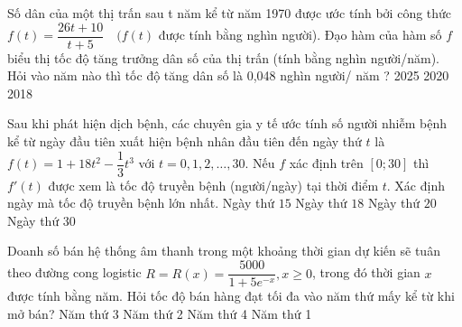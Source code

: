 \begin{ex}
	Số dân của một thị trấn sau t năm kể từ năm 1970 được ước tính bởi công thức $f(t)=\dfrac{26 t+10}{t+5}\quad (f(t)$ được tính bằng nghìn người). Đạo hàm của hàm số $f$ biểu thị tốc độ tăng trưởng dân số của thị trấn (tính bằng nghìn người/năm). Hỏi vào năm nào thì tốc độ tăng dân số là 0,048 nghìn người/ năm ?
	\choice
	{ 2025}
	{2020}
	{}
	{2018}
	\loigiai{
		
	}
\end{ex}
\begin{ex}%
	Sau khi phát hiện dịch bệnh, các chuyên gia y tế ước tính số người nhiễm bệnh kể từ ngày đầu tiên xuất hiện bệnh nhân đầu tiên đến ngày thứ $t$ là $f(t)=1+18t^2-\dfrac{1}{3}t^3$ với $t=0,1,2, \ldots, 30$. Nếu $f$ xác định trên $[0;30]$ thì $f'(t)$ được xem là tốc độ truyền bệnh (người/ngày) tại thời điểm $t$. Xác định ngày mà tốc độ truyền bệnh lớn nhất.
	\choice
	{Ngày thứ $15$}
	{\True Ngày thứ $18$}
	{Ngày thứ $20$}
	{Ngày thứ $30$}
\end{ex}
\begin{ex}
	Doanh số bán hệ thống âm thanh trong một khoảng thời gian dự kiến sẽ tuân theo đường cong logistic $R=R(x)=\dfrac{5000}{1+5 e^{-x}}, x \geq 0$, trong đó thời gian $x$ được tính bằng năm. Hỏi tốc độ bán hàng đạt tối đa vào năm thứ mấy kể từ khi mở bán?
	\choice
	{Năm thứ 3}
	{\True Năm thứ 2}
	{Năm thứ 4}
	{Năm thứ 1}
\end{ex}
